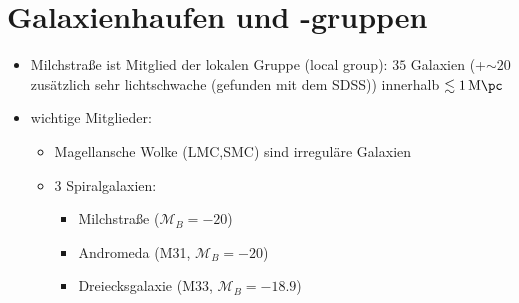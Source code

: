 \section{Galaxienhaufen und -gruppen}
\begin{itemize}
	\item Milchstraße ist Mitglied der lokalen Gruppe (local group): $\num{35}$ Galaxien (+$\sim\num{20}$ zusätzlich sehr lichtschwache (gefunden mit dem SDSS)) innerhalb $\lesssim\SI{1}{M\pc}$
	\item wichtige Mitglieder:
		\begin{itemize}[label={$\cdot$}]
			\item Magellansche Wolke (LMC,SMC) sind irreguläre Galaxien
			\item 3 Spiralgalaxien:
				\begin{itemize}
					\item[] Milchstraße ($\mathcal{M}_B=-\num{20}$)
					\item[] Andromeda (M31, $\mathcal{M}_B=-\num{20}$)
					\item[] Dreiecksgalaxie (M33, $\mathcal{M}_B=-\num{18.9}$)
				\end{itemize}
		\end{itemize}
\end{itemize}
